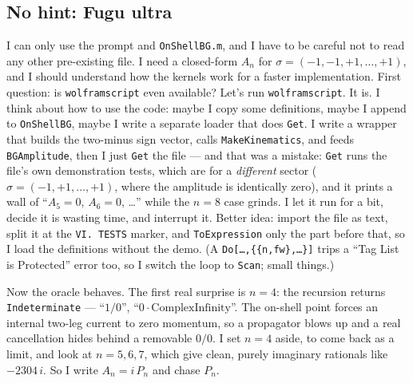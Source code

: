 \documentclass{article}
\begin{document}
\clearpage
\subsection{No hint: Fugu ultra}
\label{app:log:case3:fugu}

I can only use the prompt and \texttt{OnShellBG.m}, and I have to be careful not
to read any other pre-existing file. I need a closed-form $A_n$ for
$\sigma=(-1,-1,+1,\dots,+1)$, and I should understand how the kernels work for a
faster implementation. First question: is \texttt{wolframscript} even available?
Let's run \texttt{wolframscript}. It is. I think about how to use the code:
maybe I copy some definitions, maybe I append to \texttt{OnShellBG}, maybe I
write a separate loader that does \texttt{Get}. I write a wrapper that builds the
two-minus sign vector, calls \texttt{MakeKinematics}, and feeds
\texttt{BGAmplitude}, then I just \texttt{Get} the file --- and that was a
mistake: \texttt{Get} runs the file's own demonstration tests, which are for a
\emph{different} sector ($\sigma=(-1,+1,\dots,+1)$, where the amplitude is
identically zero), and it prints a wall of ``$A_5=0$, $A_6=0$, \dots'' while the
$n=8$ case grinds. I let it run for a bit, decide it is wasting time, and
interrupt it. Better idea: import the file as text, split it at the
\texttt{VI.\ TESTS} marker, and \texttt{ToExpression} only the part before that,
so I load the definitions without the demo. (A \texttt{Do[\dots,\{\{n,fw\},\dots\}]}
trips a ``Tag List is Protected'' error too, so I switch the loop to
\texttt{Scan}; small things.)

Now the oracle behaves. The first real surprise is $n=4$: the recursion returns
\texttt{Indeterminate} --- ``$1/0$'', ``$0\cdot\text{ComplexInfinity}$''. The
on-shell point forces an internal two-leg current to zero momentum, so a
propagator blows up and a real cancellation hides behind a removable $0/0$. I set
$n=4$ aside, to come back as a limit, and look at $n=5,6,7$, which give clean,
purely imaginary rationals like $-2304\,i$. So I write $A_n=i\,P_n$ and chase
$P_n$.
\end{document}
